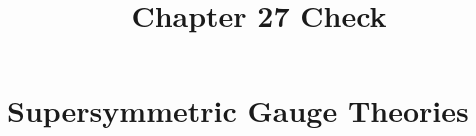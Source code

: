 \documentclass[11pt,a4paper]{article}
\title{Chapter 27 Check}
\author{}
\numberwithin{equation}{subsection}
\begin{document}
\maketitle
\setcounter{section}{26}
\section{Supersymmetric Gauge Theories}











\end{document}
